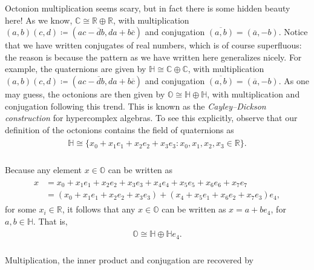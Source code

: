 \noindent\begin{remark}\label{CayleyDickson} Octonion multiplication seems scary, but in fact there is some hidden beauty here! As we know, $\mathbb{C} \cong \mathbb{R} \oplus \mathbb{R}$, with multiplication $(a, b)(c, d) \coloneqq (ac - \overline{d}b, da + b\overline{c})$ and conjugation $\overline{(a, b)} = (\overline{a}, -b)$. Notice that we have written conjugates of real numbers, which is of course superfluous: the reason is because the pattern as we have written here generalizes nicely. For example, the quaternions are given by $\mathbb{H} \cong \mathbb{C} \oplus \mathbb{C}$, with multiplication $(a, b)(c, d) \coloneqq (ac - \overline{d}b, da + b\overline{c})$ and conjugation $\overline{(a, b)} = (\overline{a}, -b)$. As one may guess, the octonions are then given by $\mathbb{O} \cong \mathbb{H} \oplus \mathbb{H}$, with multiplication and conjugation following this trend. This is known as the {\em Cayley--Dickson construction} for hypercomplex algebras. To see this explicitly, observe that our definition of the octonions contains the field of quaternions as
\begin{align*}
\begin{split}
\mathbb{H} \cong \{x_0 + x_1e_1 + x_2e_2 + x_3e_3 : x_0, x_1, x_2, x_3 \in \mathbb{R}\}.
\end{split}
\end{align*}
\noindent\\[-1.2\linespacing] Because any element $x \in \mathbb{O}$ can be written as
\begin{align*}
\begin{split}
x &= x_0 + x_1e_1 + x_2e_2 + x_3e_3 + x_4e_4 + x_5e_5 + x_6e_6 + x_7e_7\\
&= (x_0 + x_1e_1 + x_2e_2 + x_3e_3) + (x_4 + x_5e_1 + x_6e_2 + x_7e_3)e_4,
\end{split}
\end{align*}
\noindent for some $x_i \in \mathbb{R}$, it follows that any $x \in \mathbb{O}$ can be written as $x = a + be_4$, for $a, b \in \mathbb{H}$. That is,
\begin{align*}
\begin{split}
\mathbb{O} \cong \mathbb{H} \oplus \mathbb{H}e_4.
\end{split}
\end{align*}
\noindent\\[-1.3\linespacing] Multiplication, the inner product and conjugation are recovered by
\begin{align*}
\begin{split}

\end{split}
\end{align*}
\end{remark}
